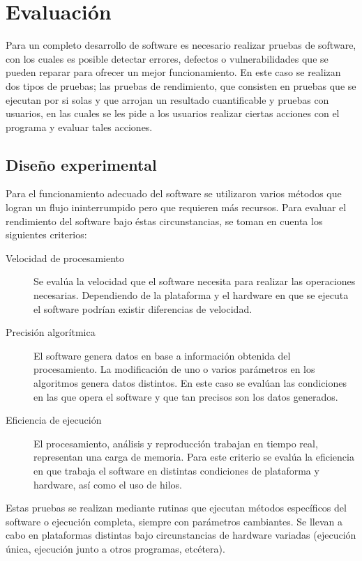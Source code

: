 \chapter{Evaluaci\'on}
\label{chap:eval}

Para un completo desarrollo de software es necesario realizar pruebas de software, con los cuales es posible detectar errores, defectos o vulnerabilidades que se pueden reparar para ofrecer un mejor funcionamiento. En este caso se realizan dos tipos de pruebas; las pruebas de rendimiento, que consisten en pruebas que se ejecutan por si solas y que arrojan un resultado cuantificable y pruebas con usuarios, en las cuales se les pide a los usuarios realizar ciertas acciones con el programa y evaluar tales acciones.

\section{Dise\~no experimental}
Para el funcionamiento adecuado del software se utilizaron varios m\'etodos que logran un flujo ininterrumpido pero que requieren m\'as recursos. Para evaluar el rendimiento del software bajo \'estas circunstancias, se toman en cuenta los siguientes criterios: 
\begin{description}
\item [Velocidad de procesamiento]{Se eval\'ua la velocidad que el software necesita para realizar las operaciones necesarias. Dependiendo de la plataforma y el hardware en que se ejecuta el software podr\'ian existir diferencias de velocidad.}
\item [Precisi\'on algor\'itmica]{El software genera datos en base a informaci\'on obtenida del procesamiento. La modificaci\'on de uno o varios par\'ametros en los algoritmos genera datos distintos. En este caso se eval\'uan las condiciones en las que opera el software y que tan precisos son los datos generados.}
\item [Eficiencia de ejecuci\'on]{El procesamiento, an\'alisis y reproducci\'on trabajan en tiempo real, representan una carga de memoria. Para este criterio se eval\'ua la eficiencia en que trabaja el software en distintas condiciones de plataforma y hardware, as\'i como el uso de hilos.}
\end{description}

\noindent Estas pruebas se realizan mediante rutinas que ejecutan m\'etodos espec\'ificos del software o ejecuci\'on completa, siempre con par\'ametros cambiantes. Se llevan a cabo en plataformas distintas bajo circunstancias de hardware variadas (ejecuci\'on \'unica, ejecuci\'on junto a otros programas, etc\'etera).

